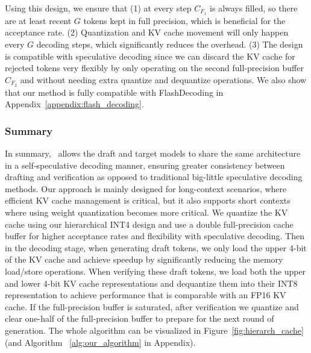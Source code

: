 Using this design, we ensure that (1) at every step $C_{F_1}$ is always filled, so there are at least recent $G$ tokens kept in full precision, which is beneficial for the acceptance rate. (2) Quantization and KV cache movement will only happen every $G$ decoding steps, which significantly reduces the overhead. (3) The design is compatible with speculative decoding since we can discard the KV cache for rejected tokens very flexibly by only operating on the second full-precision buffer $C_{F_2}$ and without needing extra quantize and dequantize operations. We also show that our method is fully compatible with FlashDecoding in Appendix~\ref{appendix:flash_decoding}.


\subsubsection{Summary}
In summary, \OURS\ allows the draft and target models to share the same 
architecture in a self-speculative decoding manner, ensuring greater consistency 
between drafting and verification as opposed to traditional big-little speculative 
decoding methods. Our approach is mainly designed for long-context scenarios, 
where efficient KV cache management is critical, but it also supports short contexts where using weight quantization becomes more critical.
We quantize the KV cache using our 
hierarchical INT4 design and use a double full-precision cache buffer for higher acceptance 
rates and flexibility with speculative decoding. Then in the decoding stage, when 
generating draft tokens, we only load the upper 4-bit of the KV cache and achieve 
speedup by significantly reducing the memory load/store operations. When verifying 
these draft tokens, we load both the upper and lower 4-bit KV cache representations 
and dequantize them into their INT8 representation to achieve performance that is 
comparable with an FP16 KV cache. If the full-precision buffer is saturated, after 
verification we quantize and clear one-half of the full-precision buffer to prepare for the next 
round of generation. The whole algorithm can be visualized in Figure~\ref{fig:hierarch_cache} (and Algorithm ~\ref{alg:our_algorithm} in Appendix).

